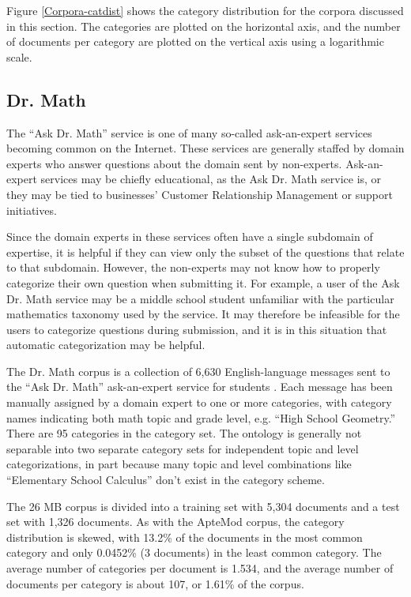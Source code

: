 Figure \ref{Corpora-catdist} shows the category distribution for
the corpora discussed in this section.  The categories are plotted on
the horizontal axis, and the number of documents per category are
plotted on the vertical axis using a logarithmic scale.


\subsection{Dr. Math}

The ``Ask Dr. Math'' service \cite{drmath} is one of many so-called
ask-an-expert services becoming common on the Internet.  These
services are generally staffed by domain experts who answer questions
about the domain sent by non-experts.  Ask-an-expert services may be
chiefly educational, as the Ask Dr. Math service is, or they may be
tied to businesses' Customer Relationship Management or support
initiatives.

Since the domain experts in these services often have a single
subdomain of expertise, it is helpful if they can view only the subset
of the questions that relate to that subdomain.  However, the
non-experts may not know how to properly categorize their own question
when submitting it.  For example, a user of the Ask Dr. Math service
may be a middle school student unfamiliar with the particular
mathematics taxonomy used by the service.  It may therefore be
infeasible for the users to categorize questions during submission,
and it is in this situation that automatic categorization may be
helpful.

The Dr. Math corpus is a collection of 6,630 English-language messages
sent to the ``Ask Dr. Math'' ask-an-expert service for
students \cite{drmath}. Each message has been manually assigned by a
domain expert to one or more categories,
with category names indicating both math topic and grade level,
e.g. ``High School Geometry.''  There are 95 categories in the
category set.  The ontology is generally not
separable into two separate category sets for independent topic and
level categorizations, in part because many topic and level
combinations like ``Elementary School Calculus'' don't exist in the
category scheme.

The 26 MB corpus is divided into a training set with 5,304 documents
and a test set with 1,326 documents.  As with the ApteMod corpus, the
category distribution is skewed, with 13.2\% of the documents in the
most common category and only 0.0452\% (3 documents) in the least
common category.  The average number of categories per document is
1.534, and the average number of documents per category is about 107,
or 1.61\% of the corpus.

